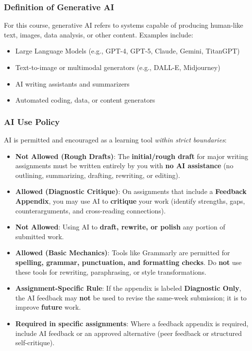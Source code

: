 \documentclass[11pt]{article}     %
\begin{document}
\subsubsection*{Definition of Generative AI}

\noindent For this course, generative AI refers to systems capable of producing human-like text, images, data analysis, or other content. Examples include:

\begin{itemize}
    \item Large Language Models (e.g., GPT-4, GPT-5, Claude, Gemini, TitanGPT)
    \item Text-to-image or multimodal generators (e.g., DALL-E, Midjourney)
    \item AI writing assistants and summarizers
    \item Automated coding, data, or content generators
\end{itemize}

\subsubsection*{AI Use Policy}

AI is permitted and encouraged as a learning tool \textit{within strict boundaries}:

\begin{itemize}
    \item \textbf{Not Allowed (Rough Drafts)}: The \textbf{initial/rough draft} for major writing assignments must be written entirely by you with \textbf{no AI assistance} (no outlining, summarizing, drafting, rewriting, or editing).
    \item \textbf{Allowed (Diagnostic Critique)}: On assignments that include a \textbf{Feedback Appendix}, you may use AI to \textbf{critique} your work (identify strengths, gaps, counterarguments, and cross-reading connections).
    \item \textbf{Not Allowed}: Using AI to \textbf{draft, rewrite, or polish} any portion of submitted work.
    \item \textbf{Allowed (Basic Mechanics)}: Tools like Grammarly are permitted for \textbf{spelling, grammar, punctuation, and formatting checks}. Do \textbf{not} use these tools for rewriting, paraphrasing, or style transformations.
    \item \textbf{Assignment-Specific Rule}: If the appendix is labeled \textbf{Diagnostic Only}, the AI feedback may \textbf{not} be used to revise the same-week submission; it is to improve \textbf{future} work.
    \item \textbf{Required in specific assignments}: Where a feedback appendix is required, include AI feedback or an approved alternative (peer feedback or structured self-critique).
\end{itemize}
\end{document}
